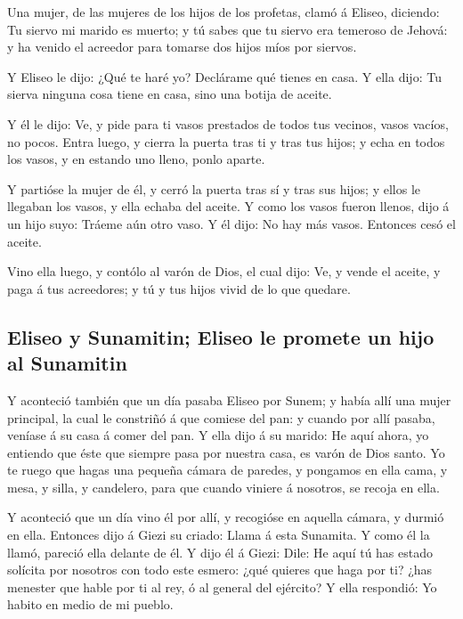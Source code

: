  Una mujer, de las mujeres de los hijos de los profetas,
clamó á Eliseo, diciendo: Tu siervo mi marido es muerto; y tú sabes que
tu siervo era temeroso de Jehová: y ha venido el acreedor para tomarse
dos hijos míos por siervos.

 Y Eliseo le dijo: ¿Qué te haré yo? Declárame qué tienes
en casa. Y ella dijo: Tu sierva ninguna cosa tiene en casa, sino una
botija de aceite.

 Y él le dijo: Ve, y pide para ti vasos prestados de todos
tus vecinos, vasos vacíos, no pocos.  Entra luego, y
cierra la puerta tras ti y tras tus hijos; y echa en todos los vasos, y
en estando uno lleno, ponlo aparte.

 Y partióse la mujer de él, y cerró la puerta tras sí y
tras sus hijos; y ellos le llegaban los vasos, y ella echaba del aceite.
 Y como los vasos fueron llenos, dijo á un hijo suyo:
Tráeme aún otro vaso. Y él dijo: No hay más vasos. Entonces cesó el
aceite.

 Vino ella luego, y contólo al varón de Dios, el cual
dijo: Ve, y vende el aceite, y paga á tus acreedores; y tú y tus hijos
vivid de lo que quedare.

\hypertarget{eliseo-y-sunamitin-eliseo-le-promete-un-hijo-al-sunamitin}{%
\subsection{Eliseo y Sunamitin; Eliseo le promete un hijo al
Sunamitin}\label{eliseo-y-sunamitin-eliseo-le-promete-un-hijo-al-sunamitin}}

 Y aconteció también que un día pasaba Eliseo por Sunem; y
había allí una mujer principal, la cual le constriñó á que comiese del
pan: y cuando por allí pasaba, veníase á su casa á comer del pan.
 Y ella dijo á su marido: He aquí ahora, yo entiendo que
éste que siempre pasa por nuestra casa, es varón de Dios santo.
 Yo te ruego que hagas una pequeña cámara de paredes, y
pongamos en ella cama, y mesa, y silla, y candelero, para que cuando
viniere á nosotros, se recoja en ella.

 Y aconteció que un día vino él por allí, y recogióse en
aquella cámara, y durmió en ella.  Entonces dijo á Giezi
su criado: Llama á esta Sunamita. Y como él la llamó, pareció ella
delante de él.  Y dijo él á Giezi: Dile: He aquí tú has
estado solícita por nosotros con todo este esmero: ¿qué quieres que haga
por ti? ¿has menester que hable por ti al rey, ó al general del
ejército? Y ella respondió: Yo habito en medio de mi pueblo.

